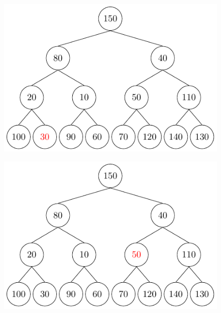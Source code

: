 \begin{center}
\begin{minipage}{0.24\textwidth}
\begin{figure}[H]
  \centering
  \includegraphics[width=\textwidth]{Figure/Percolate5.pdf}
\end{figure}
\end{minipage}
\begin{minipage}{0.24\textwidth}
\begin{figure}[H]
  \centering
  \includegraphics[width=\textwidth]{Figure/Percolate6.pdf}
\end{figure}
\end{minipage}
\begin{minipage}{0.24\textwidth}
\begin{figure}[H]
  \centering

\end{figure}
\end{minipage}
\end{center}
